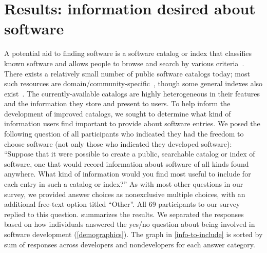 \documentclass{casicswhitepaper}
\newcommand{\totalRespondents}{69\xspace}
\begin{document}
\section{Results: information desired about software}
\label{desirable-metadata}

A potential aid to finding software is a software catalog or index that classifies known software and allows people to browse and search by various criteria~\cite{marshall2006software, allen2015looking, mena2006software, katz2015catalogs, white2014nih}.  There exists a relatively small number of public software catalogs today; most such resources are domain/community-specific~\cite[e.g.,][]{nasa2016software, hempel2016xsede, darpa2015open, allen_2012, noy2009bioportal}, though some general indexes also exist~\cite[e.g.,][]{blackduck2016open, freshcode2016, johansson2016alternative}.  The currently-available catalogs are highly heterogeneous in their features and the information they store and present to users.  To help inform the development of improved catalogs, we sought to determine what kind of information users find important to provide about software entries.  We posed the following question of all participants who indicated they had the freedom to choose software (not only those who indicated they developed software): ``Suppose that it were possible to create a public, searchable catalog or index of software, one that would record information about software of all kinds found anywhere.  What kind of information would you find most useful to include for each entry in such a catalog or index?''  As with most other questions in our survey, we provided answer choices as nonexclusive multiple choices, with an additional free-text option titled ``Other''.  All \totalRespondents participants to our survey replied to this question.   summarizes the results.  We separated the responses based on how individuals answered the yes/no question about being involved in software development (\ref{demographics}).  The graph in \ref{info-to-include} is sorted by sum of responses across developers and nondevelopers for each answer category.
\end{document}
